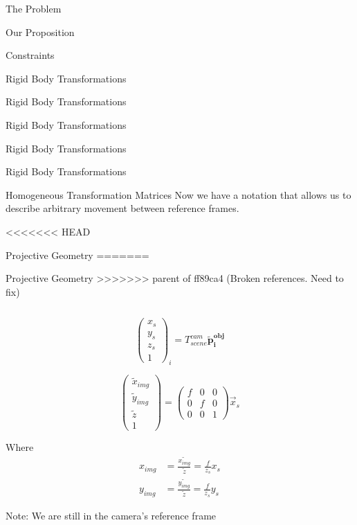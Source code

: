 \documentclass[presentation, aspectratio=1610]{beamer}
\begin{document}
\begin{frame}[label={sec:org51bdd62}]{The Problem}
\begin{frame}[label={sec:org827823c}]{Our Proposition}
\begin{frame}[label={sec:org8655799}]{Constraints}
\begin{frame}[label={sec:orgb624cd0}]{Rigid Body Transformations}
\begin{frame}[label={sec:org66cfa5c}]{Rigid Body Transformations}
\begin{frame}[label={sec:orga8040ec}]{Rigid Body Transformations}
\begin{frame}[label={sec:org2c45bb0}]{Rigid Body Transformations}
\begin{frame}[label={sec:org3238a6c}]{Rigid Body Transformations}
\begin{block}{Homogeneous Transformation Matrices}
Now we have a notation that allows us to describe arbitrary movement between reference frames.
\end{block}
\end{frame}
<<<<<<< HEAD
\begin{frame}[label={sec:orgc08b8a8}]{Projective Geometry}
=======
\begin{frame}[label={sec:org540695f}]{Projective Geometry}
>>>>>>> parent of ff89ca4 (Broken references. Need to fix)
\begin{columns}
\begin{column}{0.5\columnwidth}
\begin{equation*}
  \begin{pmatrix}
    x_{s} \\ y_{s} \\ z_{s} \\ 1
  \end{pmatrix}_{i} = T^{cam}_{scene} \mathbf{\tilde{p}^{obj}_{i}}
\end{equation*}

\begin{equation*}
  \begin{pmatrix}
    \tilde{x}_{img} \\ \tilde{y}_{img} \\ \tilde{z} \\ 1
  \end{pmatrix} =
  \begin{pmatrix}
    f& 0 & 0 \\ 0 & f & 0 \\ 0 & 0 & 1
  \end{pmatrix} \vec{x}_{s}
\end{equation*}

Where
\begin{equation*}
  \begin{aligned}
    x_{img} &= \frac{\tilde{x_{img}}}{\tilde{z}} = \frac{f}{z_{s}}x_{s} \\
    y_{img} &= \frac{\tilde{y_{img}}}{\tilde{z}} = \frac{f}{z_{s}}y_{s}
  \end{aligned}
\end{equation*}

{\tiny Note: We are still in the camera's reference frame}
\end{column}


\end{columns}
\end{frame}
\end{frame}
\end{frame}
\end{frame}
\end{frame}
\end{frame}
\end{frame}
\end{frame}
\end{frame}
\end{document}
